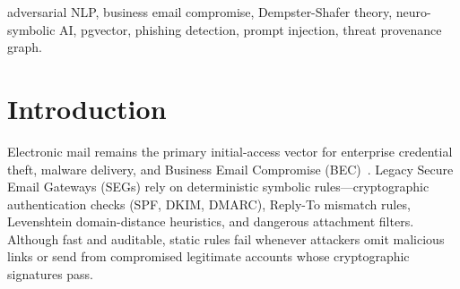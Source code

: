 \documentclass[conference]{IEEEtran}
\begin{document}
\begin{abstract}
Modern Business Email Compromise (BEC) and spear-phishing campaigns routinely evade both legacy rule-based gateways and contemporary neural classifiers. Deterministic gateways fail on zero-payload BEC and compromised legitimate accounts where SPF, DKIM, and DMARC pass, whereas pure neural and Large Language Model (LLM) scanners are vulnerable to CSS hidden-text poisoning, Unicode UTS \#39 homoglyph spoofing, and indirect prompt injection while outputting uncalibrated point scores. This paper presents \textbf{PhishTank-NS}, a cloud-deployed, horizontally scalable neuro-symbolic email defense platform built across Node.js/Express, Redis/BullMQ, Python FastAPI, React, PostgreSQL 16 with \texttt{pgvector}, and a Firefox Manifest V3 browser extension. Rather than relying on an unconstrained LLM, PhishTank-NS introduces three tightly coupled safeguards: (1) a visibility-aware adversarial de-obfuscation pipeline that strips non-rendered HTML decoy nodes and normalizes Unicode confusables before inference; (2) an uncertainty-aware Dempster-Shafer Evidence Theory fusion layer over $\Theta = \{\text{Malicious}, \text{Benign}\}$ that outputs calibrated risk intervals $[\text{Bel}(M), \text{Pl}(M)]$, epistemic uncertainty $m(\Theta)$, and conflict coefficient $K$ to flag compromised-account BEC; and (3) a 2-hop Threat Provenance Graph backed by \texttt{pgvector} HNSW indexing for $O(\log N)$ polymorphic campaign clustering. Evaluated on 2,000 strictly held-out emails from \texttt{zefang-liu/phishing-email-dataset} (14,474 train), PhishTank-NS achieves 98.50\% clean accuracy (99.83\% ROC-AUC) and 98.95\% adversarial accuracy (99.87\% recall, 99.99\% ROC-AUC) at 2.93~ms CPU inference latency and 443.12~req/sec API throughput.
\end{abstract}

\begin{IEEEkeywords}
adversarial NLP, business email compromise, Dempster-Shafer theory, neuro-symbolic AI, pgvector, phishing detection, prompt injection, threat provenance graph.
\end{IEEEkeywords}

\section{Introduction}
Electronic mail remains the primary initial-access vector for enterprise credential theft, malware delivery, and Business Email Compromise (BEC)~\cite{mitre2024phishing}. Legacy Secure Email Gateways (SEGs) rely on deterministic symbolic rules—cryptographic authentication checks (SPF, DKIM, DMARC), Reply-To mismatch rules, Levenshtein domain-distance heuristics, and dangerous attachment filters. Although fast and auditable, static rules fail whenever attackers omit malicious links or send from compromised legitimate accounts whose cryptographic signatures pass.
\end{document}
